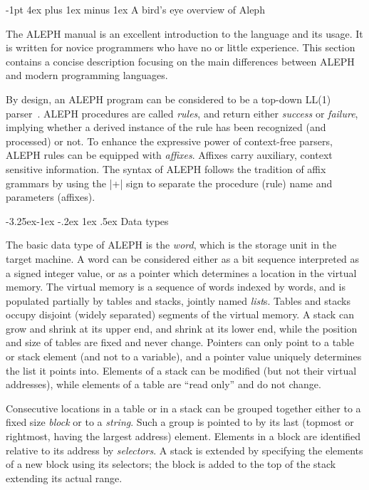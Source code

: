 \documentclass[titlepage]{article}
\makeatletter
\newcommand\A{\textsf{ALEPH}}
\newcommand\g[1]{\textsf{\color{blue!90!black}#1}}
\renewcommand\subsection{%
\@startsection{subsection}{2}{\z@}%
   {-3.25ex\@plus -1ex \@minus -.2ex}%
   {1ex \@plus .5ex}%
   {\normalfont\normalsize\bfseries}}
\renewcommand\section{%
\newpage
\@startsection{section}{1}{\z@}%
   {-1pt}%
   {4ex plus 1ex minus 1ex}%
   {\normalfont\Large\bfseries}}
\let\osection\section
\def\section {\newpage\osection}
\makeatother
\begin{document}
\section{A bird's eye overview of Aleph}\label{section:overview}

The \A{} manual \cite{A-manual} is an excellent introduction to the language
and its usage. It is written for novice programmers who have no or little
experience. This section contains a concise description focusing on the main
differences between \A{} and modern programming languages.

By design, an \A{} program can be considered to be a top-down \g{LL(1)}
parser~\cite{aho-ullman}. \A{} procedures are called \emph{rules}, and return
either \emph{success} or \emph{failure}, implying whether a derived instance
of the rule has been recognized (and processed) or not. To enhance the
expressive power of context-free parsers, \A{} rules can be equipped with
\emph{affixes}. Affixes carry auxiliary, context sensitive information. The
syntax of \A{} follows the tradition of affix grammars \cite{wijn} by using
the \pp|+| sign to separate the procedure (rule) name and parameters
(affixes).


\subsection{Data types}

The basic data type of \A{} is the \emph{word}, which is the storage unit in
the target machine. A word can be considered either as a bit sequence
interpreted as a signed integer value, or as a pointer which determines a
location in the virtual memory. The virtual memory is a sequence of words
indexed by words, and is populated partially by \g{table}s and
\g{stack}s, jointly named \emph{list}s. Tables and stacks occupy disjoint
(widely separated) segments of the virtual memory. A stack can grow and shrink
at its upper end, and shrink at its lower end, while the position and size
of tables are fixed and never change. Pointers can only point to a table or
stack element (and not to a variable), and a pointer value uniquely
determines the list it points into. Elements of a \g{stack} can be modified
(but not their virtual addresses), while elements of a \g{table} are ``read
only'' and do not change.

Consecutive locations in a \g{table} or in a \g{stack} can be grouped
together either to a fixed size \emph{block} or to a \emph{string}. Such a
group is pointed to by its last (topmost or rightmost, having the largest
address) element. Elements in a block are identified relative to its address
by \emph{selectors}. A \g{stack} is extended by specifying the elements of a
new block using its selectors; the block is added to the top of the
stack extending its actual range.
\end{document}
